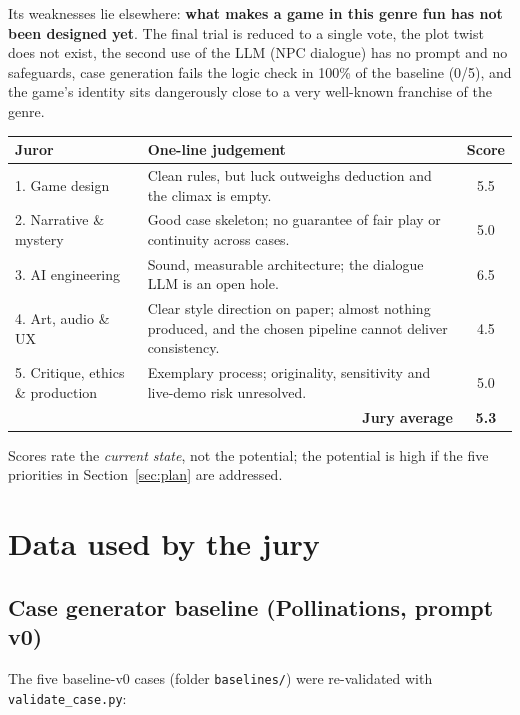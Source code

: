 \documentclass[11pt,a4paper]{article}
\newcommand{\file}[1]{\texttt{\small #1}}
\begin{document}
Its weaknesses lie elsewhere: \textbf{what makes a game in this genre fun has not been designed
yet}. The final trial is reduced to a single vote, the plot twist does not exist, the second use of
the LLM (NPC dialogue) has no prompt and no safeguards, case generation fails the logic check in
100\% of the baseline (0/5), and the game's identity sits dangerously close to a very well-known
franchise of the genre.

\begin{center}
\renewcommand{\arraystretch}{1.25}
\begin{tabularx}{\linewidth}{l X c}
\toprule
\textbf{Juror} & \textbf{One-line judgement} & \textbf{Score} \\
\midrule
1. Game design & Clean rules, but luck outweighs deduction and the climax is empty. & 5.5 \\
2. Narrative \& mystery & Good case skeleton; no guarantee of fair play or continuity across cases. & 5.0 \\
3. AI engineering & Sound, measurable architecture; the dialogue LLM is an open hole. & 6.5 \\
4. Art, audio \& UX & Clear style direction on paper; almost nothing produced, and the chosen pipeline cannot deliver consistency. & 4.5 \\
5. Critique, ethics \& production & Exemplary process; originality, sensitivity and live-demo risk unresolved. & 5.0 \\
\midrule
\multicolumn{2}{r}{\textbf{Jury average}} & \textbf{5.3} \\
\bottomrule
\end{tabularx}
\end{center}

\noindent Scores rate the \emph{current state}, not the potential; the potential is high if the five
priorities in Section~\ref{sec:plan} are addressed.

\section{Data used by the jury}

\subsection{Case generator baseline (Pollinations, prompt v0)}

The five baseline-v0 cases (folder \file{baselines/}) were re-validated with
\file{validate\_case.py}:
\end{document}
